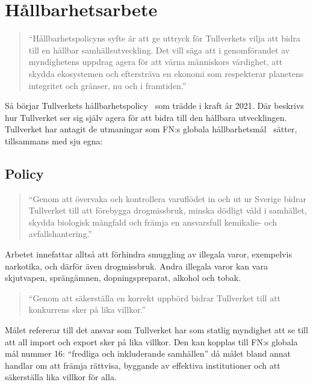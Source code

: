 \section{Hållbarhetsarbete}

\begin{quotation}
    ``Hållbarhetspolicyns syfte är att ge uttryck för Tullverkets vilja att
    bidra till en hållbar samhällsutveckling. Det vill säga att i genomförandet
    av myndighetens uppdrag agera för att värna människors värdighet, att
    skydda ekosystemen och eftersträva en ekonomi som respekterar planetens
    integritet och gränser, nu och i framtiden.''
\end{quotation}

Så börjar Tullverkets hållbarhetspolicy~\cite{policy2021} som trädde i kraft år
2021. Där beskrivs hur Tullverket ser sig själv agera för att bidra till den
hållbara utvecklingen. Tullverket har antagit de utmaningar som FN:s globala
hållbarhetsmål~\cite{fnmal} sätter, tillsammans med sju egna:

\subsection{Policy}

\begin{quotation}
    ``Genom att övervaka och kontrollera varuflödet in och ut ur Sverige bidrar
    Tullverket till att förebygga drogmissbruk, minska dödligt våld i
    samhället, skydda biologisk mångfald och främja en ansvarsfull kemikalie-
    och avfallshantering.''
\end{quotation}

Arbetet innefattar alltså att förhindra smuggling av illegala varor, exempelvis
narkotika, och därför även drogmissbruk. Andra illegala varor kan vara
skjutvapen, sprängämnen, dopningspreparat, alkohol och tobak.

\begin{quotation}
    ``Genom att säkerställa en korrekt uppbörd bidrar Tullverket till att
    konkurrens sker på lika villkor.''
\end{quotation}

Målet refererar till det ansvar som Tullverket har som statlig myndighet att
se till att all import och export sker på lika villkor. Den kan kopplas till
FN:s globala mål nummer 16: ``fredliga och inkluderande samhällen'' då målet
bland annat handlar om att främja rättvisa, byggande av effektiva institutioner
och att säkerställa lika villkor för alla. 

